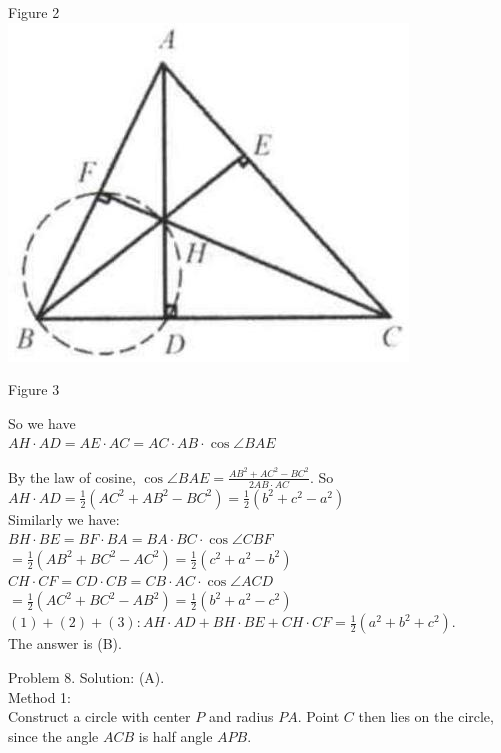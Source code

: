 \documentclass[10pt]{article}
\begin{document}
Figure 2\\
\includegraphics[max width=\textwidth, center]{2025_04_17_97bc1f7e44d93c271a88g-210(1)}

Figure 3

So we have\\
\(A H \cdot A D=A E \cdot A C=A C \cdot A B \cdot \cos \angle B A E\)


By the law of cosine, \(\cos \angle B A E=\frac{A B^{2}+A C^{2}-B C^{2}}{2 A B \cdot A C}\). So\\
\(A H \cdot A D=\frac{1}{2}\left(A C^{2}+A B^{2}-B C^{2}\right)=\frac{1}{2}\left(b^{2}+c^{2}-a^{2}\right)\)\\
Similarly we have:\\
\(B H \cdot B E=B F \cdot B A=B A \cdot B C \cdot \cos \angle C B F\)\\
\(=\frac{1}{2}\left(A B^{2}+B C^{2}-A C^{2}\right)=\frac{1}{2}\left(c^{2}+a^{2}-b^{2}\right)\)\\
\(C H \cdot C F=C D \cdot C B=C B \cdot A C \cdot \cos \angle A C D\)\\
\(=\frac{1}{2}\left(A C^{2}+B C^{2}-A B^{2}\right)=\frac{1}{2}\left(b^{2}+a^{2}-c^{2}\right)\)\\
\((1)+(2)+(3): A H \cdot A D+B H \cdot B E+C H \cdot C F=\frac{1}{2}\left(a^{2}+b^{2}+c^{2}\right)\).\\
The answer is (B).

Problem 8. Solution: (A).\\
Method 1:\\
Construct a circle with center \(P\) and radius \(P A\). Point \(C\) then lies on the circle, since the angle \(A C B\) is half angle \(A P B\).
\end{document}
